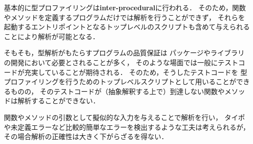 基本的に型プロファイリングは\textbf{inter-procedural}に行われる．
そのため，関数やメソッドを定義するプログラムだけでは解析を行うことができず，
それらを起動するエントリポイントとなるトップレベルのスクリプトも含めて与えられることにより解析が可能となる．

そもそも，型解析がもたらすプログラムの品質保証は
パッケージやライブラリの開発において必要とされることが多く，
そのような場面では一般にテストコードが充実していることが期待される．
そのため，そうしたテストコードを
型プロファイリングを行うためのトップレベルスクリプトとして用いることができるものの，
そのテストコードが（抽象解釈する上で）到達しない関数やメソッドは解析することができない．

関数やメソッドの引数として擬似的な入力を与えることで解析を行い，
タイポや未定義エラーなど比較的簡単なエラーを検出するような工夫は考えられるが，
その場合解析の正確性は大きく下がらざるを得ない．

%
%
%
%
%
%

